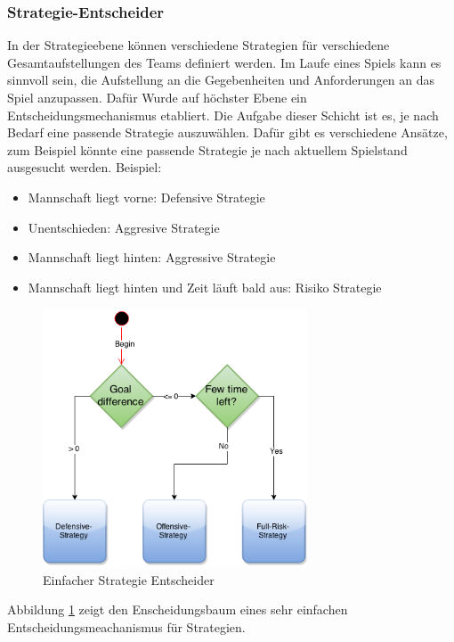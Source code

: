 \documentclass[fontsize=12pt,a4paper,final]{scrartcl}[2003/01/01]
\begin{document}
\subsubsection{Strategie-Entscheider}
In der Strategieebene können verschiedene Strategien für verschiedene Gesamtaufstellungen des Teams definiert werden. Im Laufe eines Spiels kann es sinnvoll sein, die Aufstellung an die Gegebenheiten und Anforderungen an das Spiel anzupassen. Dafür Wurde auf höchster Ebene ein Entscheidungsmechanismus etabliert. Die Aufgabe dieser Schicht ist es, je nach Bedarf eine passende Strategie auszuwählen. Dafür gibt es verschiedene Ansätze, zum Beispiel könnte eine passende Strategie je nach aktuellem Spielstand ausgesucht werden. Beispiel: 
\begin{itemize}
\item Mannschaft liegt vorne: Defensive Strategie
\item Unentschieden: Aggresive Strategie
\item Mannschaft liegt hinten: Aggressive Strategie
\item Mannschaft liegt hinten und Zeit läuft bald aus: Risiko Strategie
\end{itemize}

\begin{figure}[H]
	\centering
	\includegraphics[width=0.7\textwidth]{Grafiken/KI/SimpleStrategyDecider}
	\caption{Einfacher Strategie Entscheider}
	\label{Einfacher Strategie Entscheider}
\end{figure}

Abbildung \ref{Einfacher Strategie Entscheider} zeigt den Enscheidungsbaum eines sehr einfachen Entscheidungsmeachanismus für Strategien.
\end{document}
